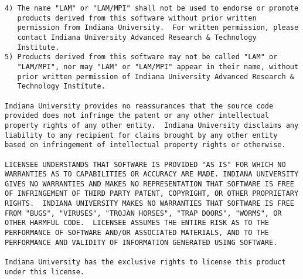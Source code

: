 \begin{verbatim}
4) The name "LAM" or "LAM/MPI" shall not be used to endorse or promote
   products derived from this software without prior written
   permission from Indiana University.  For written permission, please
   contact Indiana University Advanced Research & Technology
   Institute.  
5) Products derived from this software may not be called "LAM" or
   "LAM/MPI", nor may "LAM" or "LAM/MPI" appear in their name, without
   prior written permission of Indiana University Advanced Research &
   Technology Institute. 

Indiana University provides no reassurances that the source code
provided does not infringe the patent or any other intellectual
property rights of any other entity.  Indiana University disclaims any
liability to any recipient for claims brought by any other entity
based on infringement of intellectual property rights or otherwise.

LICENSEE UNDERSTANDS THAT SOFTWARE IS PROVIDED "AS IS" FOR WHICH NO
WARRANTIES AS TO CAPABILITIES OR ACCURACY ARE MADE. INDIANA UNIVERSITY
GIVES NO WARRANTIES AND MAKES NO REPRESENTATION THAT SOFTWARE IS FREE
OF INFRINGEMENT OF THIRD PARTY PATENT, COPYRIGHT, OR OTHER PROPRIETARY
RIGHTS.  INDIANA UNIVERSITY MAKES NO WARRANTIES THAT SOFTWARE IS FREE
FROM "BUGS", "VIRUSES", "TROJAN HORSES", "TRAP DOORS", "WORMS", OR
OTHER HARMFUL CODE.  LICENSEE ASSUMES THE ENTIRE RISK AS TO THE
PERFORMANCE OF SOFTWARE AND/OR ASSOCIATED MATERIALS, AND TO THE
PERFORMANCE AND VALIDITY OF INFORMATION GENERATED USING SOFTWARE.

Indiana University has the exclusive rights to license this product
under this license.
\end{verbatim}

